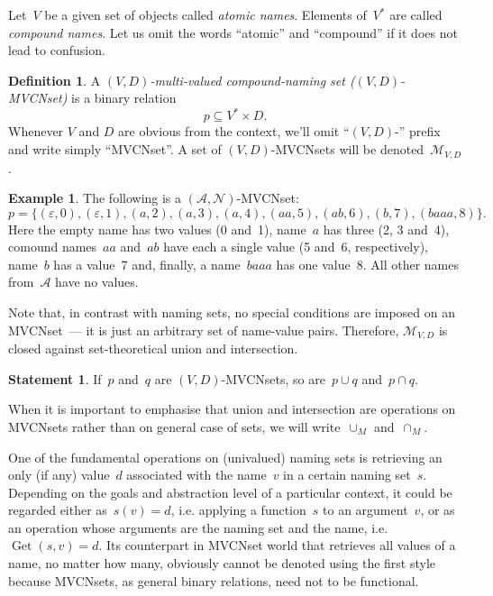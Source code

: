 \documentclass{article}
\theoremstyle{definition}
\newtheorem{Df}{Definition}
\newtheorem{St}{Statement}
\newtheorem{Ex}{Example}
\newcommand{\setcharmvcn}{M}
\newcommand{\setsymbol}[3]{\mathcal{#1}_{#2,#3}}
\newcommand{\setmvcn}[2]{\setsymbol{\setcharmvcn}{#1}{#2}}
\newcommand{\seta}{\mathcal{A}}
\newcommand{\setn}{\mathcal{N}}
\newcommand{\deref}{\operatorname{Get}}
\begin{document}
Let~$V$ be a given set of objects called \emph{atomic names}. Elements
of~$V^\ast$ are called \emph{compound names}. Let us omit the words ``atomic''
and ``compound'' if it does not lead to confusion.

\begin{Df}\label{df:mvcn}
A \emph{$(V,D)$-multi-valued compound-naming set ($(V,D)$-MVCNset)} is a binary
relation
\[
  p \subseteq V^\ast \times D .
\]
Whenever $V$ and $D$ are obvious from the context, we'll omit ``$(V,D)$-''
prefix and write simply ``MVCNset''. A set of $(V,D)$-MVCNsets will be
denoted~$\setmvcn{V}{D}$.
\end{Df}

\begin{Ex}\label{ex:mvcn}
The following is a $(\seta, \setn)$-MVCNset:
\[
  p = \{
    (\varepsilon, 0),
    (\varepsilon, 1),
    (a,           2),
    (a,           3),
    (a,           4),
    (aa,          5),
    (ab,          6),
    (b,           7),
    (baaa,        8)
  \} .
\]
Here the empty name has two values (0 and~1), name~$a$ has three (2, 3 and~4),
comound names~$aa$ and~$ab$ have each a single value (5 and~6, respectively),
name~$b$ has a value~7 and, finally, a name~$baaa$ has one value~8. All other
names from~$\seta$ have no values.
\end{Ex}

Note that, in contrast with naming sets, no special conditions are imposed
on an MVCNset~--- it is just an arbitrary set of name-value pairs.
Therefore, $\setmvcn{V}{D}$ is closed against set-theoretical union
and intersection.
\begin{St}\label{st:mvcn-setop}
If~$p$ and~$q$ are $(V,D)$-MVCNsets, so are~$p\cup q$ and~$p\cap q$.
\end{St}

When it is important to emphasise that union and intersection are operations
on MVCNsets rather than on general case of sets, we will
write~$\cup_\setcharmvcn$ and~$\cap_\setcharmvcn$.

One of the fundamental operations on (univalued) naming sets is retrieving
an only (if any) value~$d$ associated with the name~$v$ in a certain naming
set~$s$.  Depending on the goals and abstraction level of a particular
context, it could be regarded either as~$s(v)=d$, i.e. applying a function~$s$
to an argument~$v$, or as an operation whose arguments are the naming set and
the name, i.e.~$\deref(s, v)=d$. Its counterpart in MVCNset world that
retrieves all values of a name, no matter how many, obviously cannot be denoted
using the first style because MVCNsets, as general binary relations, need not
to be functional.
\end{document}
